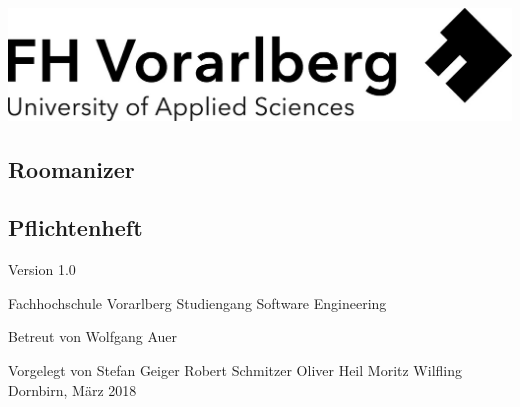 \documentclass[a4paper,12pt,twoside]{scrreprt}
\begin{document}
    \cleardoublepage   %
    \thispagestyle{empty}
    \begin{titlepage}
        \begin{flushright}
            \includegraphics[width=0.4\linewidth]{./assets/Logo-A3}
        \end{flushright}
        \begin{flushleft}
            \section*{Roomanizer}
            \subsection*{Pflichtenheft}
            \vspace{1cm}

            Version 1.0\\
            \vspace{0.5cm}


            \vspace{2cm}
            Fachhochschule Vorarlberg\newline
            Studiengang Software Engineering

            \vspace{0.5cm}

            Betreut von\newline
            Wolfgang Auer

            \vspace{0.5cm}

            Vorgelegt von\newline
            Stefan Geiger\newline
            Robert Schmitzer\newline
            Oliver Heil\newline
            Moritz Wilfling\newline
            Dornbirn, März 2018
        \end{flushleft}
    \end{titlepage}

    \cleardoublepage   %
    \tableofcontents
\end{document}
